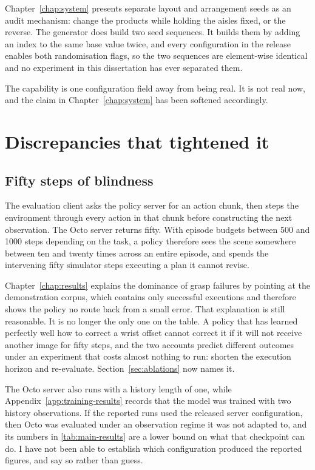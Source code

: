 Chapter~\ref{chap:system} presents separate layout and arrangement seeds as an audit mechanism: change the products while holding the aisles fixed, or the reverse. The generator does build two seed sequences. It builds them by adding an index to the same base value twice, and every configuration in the release enables both randomisation flags, so the two sequences are element-wise identical and no experiment in this dissertation has ever separated them.

The capability is one configuration field away from being real. It is not real now, and the claim in Chapter~\ref{chap:system} has been softened accordingly.

\section{Discrepancies that tightened it}

\subsection*{Fifty steps of blindness}

The evaluation client asks the policy server for an action chunk, then steps the environment through every action in that chunk before constructing the next observation. The Octo server returns fifty. With episode budgets between 500 and 1000 steps depending on the task, a policy therefore sees the scene somewhere between ten and twenty times across an entire episode, and spends the intervening fifty simulator steps executing a plan it cannot revise.

Chapter~\ref{chap:results} explains the dominance of grasp failures by pointing at the demonstration corpus, which contains only successful executions and therefore shows the policy no route back from a small error. That explanation is still reasonable. It is no longer the only one on the table. A policy that has learned perfectly well how to correct a wrist offset cannot correct it if it will not receive another image for fifty steps, and the two accounts predict different outcomes under an experiment that costs almost nothing to run: shorten the execution horizon and re-evaluate. Section~\ref{sec:ablations} now names it.

The Octo server also runs with a history length of one, while Appendix~\ref{app:training-results} records that the model was trained with two history observations. If the reported runs used the released server configuration, then Octo was evaluated under an observation regime it was not adapted to, and its numbers in \ref{tab:main-results} are a lower bound on what that checkpoint can do. I have not been able to establish which configuration produced the reported figures, and say so rather than guess.

